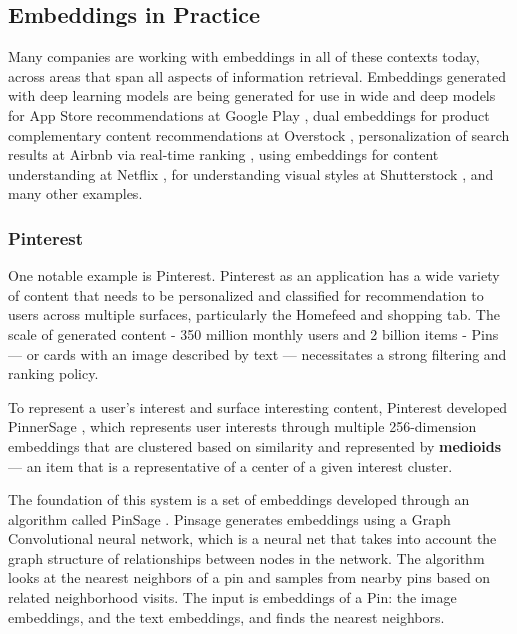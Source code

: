 \documentclass[11pt, table]{diazessay} %
\begin{document}
\begin{sloppypar}
\subsection{Embeddings in Practice}

Many companies are working with embeddings in all of these contexts today, across areas that span all aspects of information retrieval. Embeddings generated with deep learning models are being generated for use in wide and deep models for App Store recommendations at Google Play \citep{zhang2019deep}, dual embeddings for product complementary content recommendations at Overstock \citep{kvernadze2022two}, personalization of search results at Airbnb via real-time ranking \citep{grbovic2018real}, using embeddings for content understanding at Netflix \citep{dye_ekandham_saluja_rastogi_2020}, for understanding visual styles at Shutterstock \citep{gomez2022learning}, and many other examples.

\subsubsection{Pinterest}

One notable example is Pinterest. Pinterest as an application has a wide variety of content that needs to be personalized and classified for recommendation to users across multiple surfaces, particularly the Homefeed and shopping tab. The scale of generated content - 350 million monthly users and 2 billion items - Pins --- or cards with an image described by text --- necessitates a strong filtering and ranking policy.

To represent a user's interest and surface interesting content, Pinterest developed PinnerSage \citep{pal2020pinnersage}, which represents user interests through multiple 256-dimension embeddings that are clustered based on similarity and represented by \textbf{medioids} --- an item that is a representative of a center of a given interest cluster.

The foundation of this system is a set of embeddings developed through an algorithm called PinSage \citep{ying2018graph}. Pinsage generates embeddings using a Graph Convolutional neural network, which is a neural net that takes into account the graph structure of relationships between nodes in the network. The algorithm looks at the nearest neighbors of a pin and samples from nearby pins based on related neighborhood visits. The input is embeddings of a Pin: the image embeddings, and the text embeddings, and finds the nearest neighbors.


\end{sloppypar}
\end{document}
